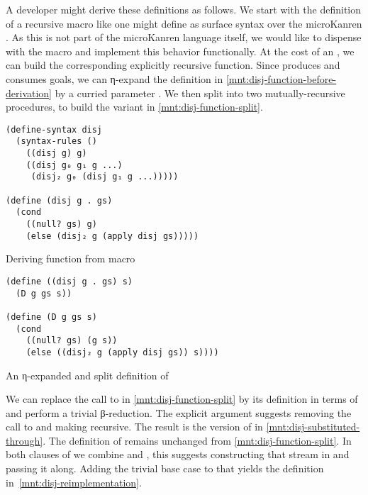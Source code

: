\documentclass[sigplan,balance,pbalance,natbib=false]{acmart}
\begin{document}
A developer might derive these definitions as follows. We start with
the definition of a recursive  macro like one might
define as surface syntax over the microKanren . As
this is not part of the microKanren language itself, we would like to
dispense with the macro and implement this behavior functionally. At
the cost of an , we can build the corresponding
explicitly recursive  function.
Since  produces and consumes goals, we can η-expand
the definition in \cref{mnt:disj-function-before-derivation} by a
curried parameter . We then split  into
two mutually-recursive procedures, to build the variant in
\cref{mnt:disj-function-split}.

\begin{listing}
\begin{verbatim}
(define-syntax disj
  (syntax-rules ()
    ((disj g) g)
    ((disj g₀ g₁ g ...)
     (disj₂ g₀ (disj g₁ g ...)))))

(define (disj g . gs)
  (cond
    ((null? gs) g)
    (else (disj₂ g (apply disj gs)))))
\end{verbatim}
  \caption{Deriving  function from macro}\label{mnt:disj-function-before-derivation}
\end{listing}

\begin{listing}
\begin{verbatim}
(define ((disj g . gs) s)
  (D g gs s))

(define (D g gs s)
  (cond
    ((null? gs) (g s))
    (else ((disj₂ g (apply disj gs)) s))))
\end{verbatim}
  \caption{An η-expanded and split definition of }\label{mnt:disj-function-split}
\end{listing}

We can replace the call to  in
\cref{mnt:disj-function-split} by its definition in terms
of  and perform a trivial β-reduction. The
explicit  argument suggests removing the call
to  and making  recursive. The result
is the version of  in
\cref{mnt:disj-substituted-through}. The definition
of  remains unchanged from
\cref{mnt:disj-function-split}. In both clauses of  we
combine  and , this suggests constructing
that stream in  and passing it along. Adding the
trivial base case to that  yields the definition
in~\cref{mnt:disj-reimplementation}.
\end{document}
